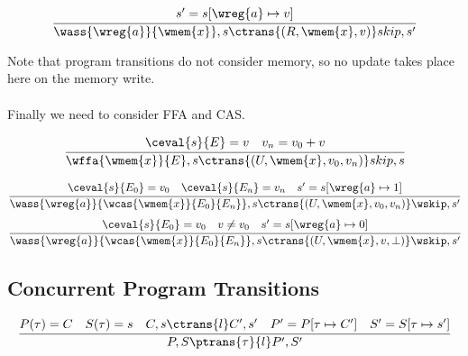 \begin{minipage}{.5\textwidth}
    \[\cfrac{
        s' = s[\wreg{a} \mapsto v]
    }{
        \wass{\wreg{a}}{\wmem{x}}, s \ctrans{(R, \wmem{x}, v)} skip, s'
    }\]
\end{minipage}
Note that program transitions do not consider memory, so no update takes place here on the memory write.
\\
\\ Finally we need to consider FFA and CAS.
\\ \begin{minipage}{.5\textwidth}
    \[\cfrac{
        \ceval{s}{E} = v \quad v_n = v_0 + v
    }{
        \wffa{\wmem{x}}{E},s \ctrans{(U, \wmem{x}, v_0, v_n)} skip, s
    }\]
\end{minipage}
\begin{minipage}{.5\textwidth}
    \[
        \cfrac{
            \ceval{s}{E_0} = v_0 \quad \ceval{s}{E_n} = v_n \quad s' = s[\wreg{a} \mapsto 1]
        }{
            \wass{\wreg{a}}{\wcas{\wmem{x}}{E_0}{E_n}}, s \ctrans{(U, \wmem{x}, v_0, v_n)} \wskip, s'
        }
    \]
    \[
        \cfrac{
            \ceval{s}{E_0} = v_0 \quad v \neq v_0 \quad s' = s[\wreg{a} \mapsto 0]
        }{
            \wass{\wreg{a}}{\wcas{\wmem{x}}{E_0}{E_n}}, s \ctrans{(U, \wmem{x}, v, \bot)} \wskip, s'
        }
    \]    
\end{minipage}



\subsection{Concurrent Program Transitions}
\[\cfrac{
    P(\tau) = C \quad S(\tau) = s \quad C,s \ctrans{l} C', s' \quad P' = P[\tau \mapsto C'] \quad S'=S[\tau \mapsto s']
}{
    P, S \ptrans{\tau}{l} P', S'
}\]

